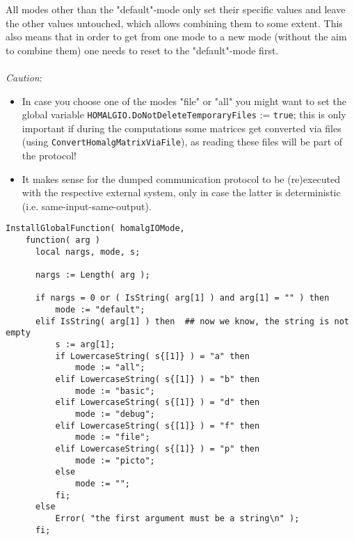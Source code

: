 \documentclass[a4paper,11pt]{report}
\begin{document}
{{{ All modes other than the "default"-mode only set their specific values and
leave the other values untouched, which allows combining them to some extent.
This also means that in order to get from one mode to a new mode (without the
aim to combine them) one needs to reset to the "default"-mode first. \\
\\
 \emph{Caution}: 
\begin{itemize}
\item In case you choose one of the modes "file" or "all" you might want to set the
global variable \texttt{HOMALG{\textunderscore}IO.DoNotDeleteTemporaryFiles} := \texttt{true}; this is only important if during the computations some matrices get
converted via files (using \texttt{ConvertHomalgMatrixViaFile}), as reading these files will be part of the protocol!
\item It makes sense for the dumped communication protocol to be (re)executed with
the respective external system, only in case the latter is deterministic (i.e.
same-input-same-output).
\end{itemize}
 
\begin{Verbatim}[fontsize=\small,frame=single,label=Code]
  InstallGlobalFunction( homalgIOMode,
    function( arg )
      local nargs, mode, s;
      
      nargs := Length( arg );
      
      if nargs = 0 or ( IsString( arg[1] ) and arg[1] = "" ) then
          mode := "default";
      elif IsString( arg[1] ) then	## now we know, the string is not empty
          s := arg[1];
          if LowercaseString( s{[1]} ) = "a" then
              mode := "all";
          elif LowercaseString( s{[1]} ) = "b" then
              mode := "basic";
          elif LowercaseString( s{[1]} ) = "d" then
              mode := "debug";
          elif LowercaseString( s{[1]} ) = "f" then
              mode := "file";
          elif LowercaseString( s{[1]} ) = "p" then
              mode := "picto";
          else
              mode := "";
          fi;
      else
          Error( "the first argument must be a string\n" );
      fi;
      

\end{Verbatim}}}}
\end{document}
